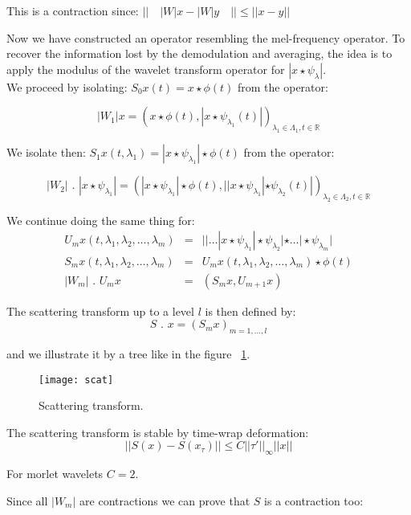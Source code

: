 \documentclass[onecolumn,12pt]{article}
\begin{document}
		This is a contraction since: $||\quad|W|x - |W|y\quad|| \leq ||x-y||$ 
		
		Now we have constructed an operator resembling the mel-frequency operator. To recover the information lost by the demodulation and averaging, the idea is to apply the modulus of the wavelet transform operator for $|x \star \psi_{\lambda}|$.\\
		
		We proceed by isolating: $S_0x(t)= x \star \phi(t)$ from the operator:
		
		$$|W_1| x= (x\star \phi(t), |x \star \psi_{\lambda_1}(t)|)_{\lambda _1\in \Lambda_1,t \in \mathbb{R}}$$
		
		We isolate then: $S_1x(t,\lambda_1)= |x \star \psi_{\lambda_1}|\star \phi(t)$ from the operator:
		
		$$|W_2| \text{\ . }|x \star \psi_{\lambda_1}|= (|x \star \psi_{\lambda_1}|\star \phi(t), ||x \star \psi_{\lambda_1}| \star \psi_{\lambda_2}(t)|)_{\lambda _2\in \Lambda_2,t \in \mathbb{R}}$$
		
		We continue doing the same thing for:
		\begin{eqnarray}
			U_m x(t,\lambda_1,\lambda_2,\dots,\lambda_m) &=& ||\dots|x \star \psi_{\lambda_1}|\star \psi_{\lambda_2}|\star \dots|\star \psi_{\lambda_m}|\\
			S_mx(t,\lambda_1,\lambda_2,\dots,\lambda_m)&=& U_mx(t,\lambda_1,\lambda_2,\dots,\lambda_m)\star \phi(t)\\
			|W_m| \text{\ . }U_mx&=& (S_mx,U_{m+1}x)
		\end{eqnarray}
		
		
		The scattering transform up to a level $l$ is then defined by:
		\begin{equation}
			S\text{\ . }x=(S_mx)_{m=1,\dots,l}
		\end{equation}
		
		and we illustrate it by a tree like in the figure ~\ref{fig:scat}.\\
		\begin{figure}
			\centering
			\texttt{[image: scat]}
			\caption{\label{fig:scat} Scattering transform.}
		\end{figure}
		
		The scattering transform is stable by time-wrap deformation:
		$$||S(x)-S(x_{\tau})||\leq C ||\tau'||_{\infty} || x||$$
		
		For morlet wavelets $C=2$.
		
		Since all $|W_m|$ are contractions we can prove that $S$ is a contraction too:
		
\end{document}
